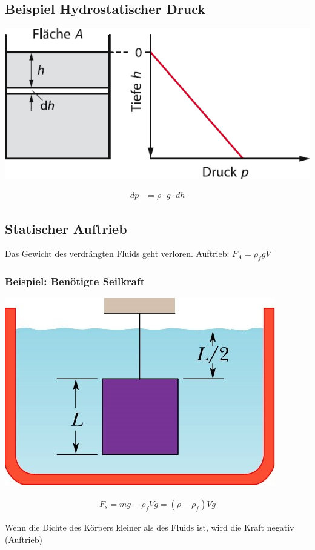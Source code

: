 \documentclass[a4paper]{scrartcl}
\begin{document}
\subsection{Beispiel Hydrostatischer Druck}
	\begin{multicols}{2}
		\includegraphics[width=\linewidth]{img/hydrostatischer_druck}
		
		\begin{align*}
		dp &= \rho \cdot g \cdot dh
		\end{align*}	
	\end{multicols}


\subsection{Statischer Auftrieb}
	Das Gewicht des verdrängten Fluids geht verloren. Auftrieb: $F_A = \rho_f g V$
	
\subsubsection{Beispiel: Benötigte Seilkraft}
	\begin{multicols}{2}
		\includegraphics[width=0.9\linewidth]{img/statischer_auftrieb.jpg}
		
		\begin{align*}
			F_s= mg - \rho_f V g = (\rho - \rho_f) V g
		\end{align*}
		
		Wenn die Dichte des Körpers kleiner als des Fluids ist, wird die Kraft negativ (Auftrieb)
	\end{multicols}
\end{document}
